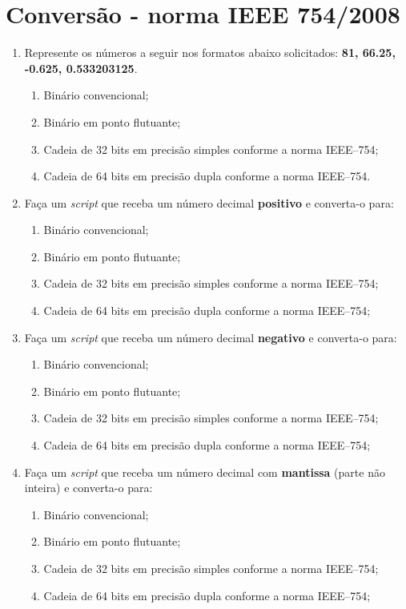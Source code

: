 
\section{Conversão - norma IEEE 754/2008}
\label{sec:conversão}

\begin{enumerate}[label=\thesection.\arabic*]
\item Represente os números a seguir nos formatos abaixo solicitados: 
{\bf 81, 66.25, -0.625, 0.533203125}.
    \begin{enumerate}
        \item Binário convencional;
        \item Binário em ponto flutuante;
        \item Cadeia de 32 bits em precisão simples conforme a norma IEEE--754;
        \item Cadeia de 64 bits em precisão dupla conforme a norma IEEE--754.
    \end{enumerate}
    
\item Faça um {\it script} que receba um número decimal {\bf positivo} e converta-o para:
    \begin{enumerate}
        \item Binário convencional;
        \item Binário em ponto flutuante;
        \item Cadeia de 32 bits em precisão simples conforme a norma IEEE--754;
        \item Cadeia de 64 bits em precisão dupla conforme a norma IEEE--754;
    \end{enumerate}
    
\item Faça um {\it script} que receba um número decimal {\bf negativo} e converta-o para:
	\begin{enumerate}
        \item Binário convencional;
        \item Binário em ponto flutuante;
        \item Cadeia de 32 bits em precisão simples conforme a norma IEEE--754;
        \item Cadeia de 64 bits em precisão dupla conforme a norma IEEE--754;
    \end{enumerate}
    
\item Faça um {\it script} que receba um número decimal com {\bf mantissa} (parte não inteira) e converta-o para:
\begin{enumerate}
        \item Binário convencional;
        \item Binário em ponto flutuante;
        \item Cadeia de 32 bits em precisão simples conforme a norma IEEE--754;
        \item Cadeia de 64 bits em precisão dupla conforme a norma IEEE--754;
\end{enumerate}


\end{enumerate}
